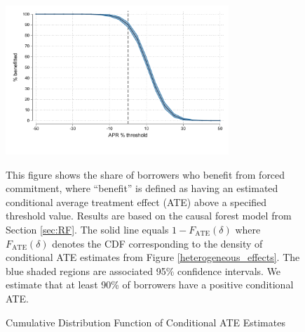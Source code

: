 \vspace{.3in}
\begin{figure}[H]
    \begin{center}
  \caption{Cumulative Distribution Function of Conditional ATE Estimates}
  \includegraphics[width=0.75\textwidth]{Figuras/cdf_CATE.pdf} 
    \label{fig:CATEsurvival}
    \end{center}
    
    \scriptsize This figure shows the share of borrowers who benefit from forced commitment, where ``benefit'' is defined as having an estimated conditional average treatment effect (ATE) above a specified threshold value. Results are based on the causal forest model from Section \ref{sec:RF}. The solid line equals $1 - F_\text{ATE}(\delta)$ where $F_\text{ATE}(\delta)$ denotes the CDF corresponding to the density of conditional ATE estimates from Figure \ref{heterogeneous_effects}. The blue shaded regions are associated 95\% confidence intervals. We estimate that at least 90\% of borrowers have a positive conditional ATE. 
\end{figure}
 


  
\cleardoublepage

